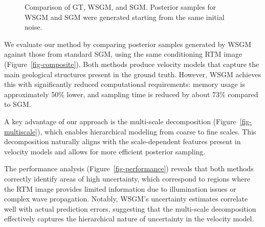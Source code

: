 \documentclass[
]{article}
\begin{document}
\begin{figure}


\caption{\label{fig-comparison}Comparison of GT, WSGM, and SGM.
Posterior samples for WSGM and SGM were generated starting from the same
initial noise.}

\end{figure}%

We evaluate our method by comparing posterior samples generated by WSGM
against those from standard SGM, using the same conditioning RTM image
(Figure~\ref{fig-composite}). Both methods produce velocity models that
capture the main geological structures present in the ground truth.
However, WSGM achieves this with significantly reduced computational
requirements: memory usage is approximately 50\% lower, and sampling
time is reduced by about 73\% compared to SGM.

A key advantage of our approach is the multi-scale decomposition
(Figure~\ref{fig-multiscale}), which enables hierarchical modeling from
coarse to fine scales. This decomposition naturally aligns with the
scale-dependent features present in velocity models and allows for more
efficient posterior sampling.

The performance analysis (Figure~\ref{fig-performance}) reveals that
both methods correctly identify areas of high uncertainty, which
correspond to regions where the RTM image provides limited information
due to illumination issues or complex wave propagation. Notably, WSGM's
uncertainty estimates correlate well with actual prediction errors,
suggesting that the multi-scale decomposition effectively captures the
hierarchical nature of uncertainty in the velocity model.
\end{document}

